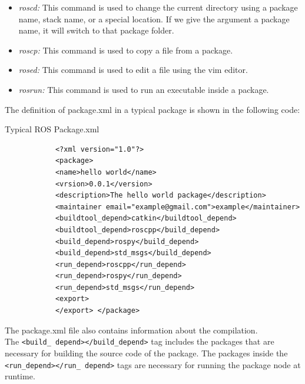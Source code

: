\documentclass[../../main]{subfiles}
\begin{document}
\begin{itemize}
    \item
    \emph{roscd:} This command is used to change the current directory using a
      package name, stack name, or a special location. If we give the
      argument a package name, it will switch to that package folder.
    \item
    \emph{roscp:} This command is used to copy a file from a package.
    \item
    \emph{rosed:} This command is used to edit a file using the vim editor.
    \item
    \emph{rosrun:} This command is used to run an executable inside a package.
    \end{itemize}
    The definition of package.xml in a typical package is shown in the following
    code:
        \begin{codebox}[]{ Typical ROS Package.xml}    
            \begin{verbatim}
            <?xml version="1.0"?>
            <package>
            <name>hello world</name>
            <vrsion>0.0.1</version>
            <description>The hello world package</description>
            <maintainer email="example@gmail.com">example</maintainer>
            <buildtool_depend>catkin</buildtool_depend>
            <buildtool_depend>roscpp</build_depend>
            <build_depend>rospy</build_depend>
            <build_depend>std_msgs</build_depend>
            <run_depend>roscpp</run_depend>
            <run_depend>rospy</run_depend>
            <run_depend>std_msgs</run_depend>
            <export>
            </export> </package>
        \end{verbatim}
    \end{codebox}

        The package.xml file also contains information about the compilation.\\ The \texttt{<build\_
        depend></build\_depend>} tag includes the packages that are necessary for building
        the source code of the package. The packages inside the \texttt{<run\_depend></run\_
        depend>} tags are necessary for running the package node at runtime.
\end{document}
